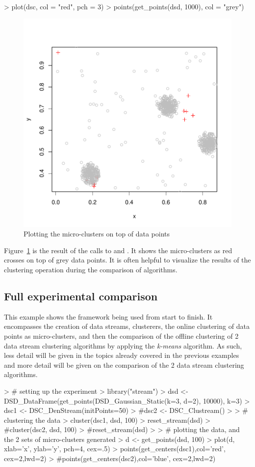 \documentclass[nojss]{jss}
\begin{document}
\begin{Schunk}
\begin{Sinput}
> plot(dsc, col = "red", pch = 3)
> points(get_points(dsd, 1000), col = "grey")
\end{Sinput}
\end{Schunk}

\begin{figure}
\centering
\includegraphics[width=.5\linewidth]{stream-plot2}
\caption{Plotting the micro-clusters on top of data points}
\label{figure:plot2}
\end{figure}

Figure~\ref{figure:plot2} is the result of the calls to  and . It shows the micro-clusters as red crosses on top of grey data points. It is often helpful to visualize the results of the clustering operation during the comparison of algorithms.

\subsection{Full experimental comparison}
\label{examples:full}

This example shows the  framework being used from start to finish. It encompasses the creation of data streams, clusterers, the online clustering of data points as micro-clusters, and then the comparison of the offline clustering of 2 data stream clustering algorithms by applying the \textit{k-means} algorithm. As such, less detail will be given in the topics already covered in the previous examples and more detail will be given on the comparison of the 2 data stream clustering algorithms.

\begin{Schunk}
\begin{Sinput}
> # setting up the experiment
> library("stream")
> dsd <- DSD_DataFrame(get_points(DSD_Gaussian_Static(k=3, d=2), 10000), k=3)
> dsc1 <- DSC_DenStream(initPoints=50)
> #dsc2 <- DSC_Clustream()
> 
> # clustering the data
> cluster(dsc1, dsd, 100)
> reset_stream(dsd)
> #cluster(dsc2, dsd, 100)
> #reset_stream(dsd)
> 
> # plotting the data, and the 2 sets of micro-clusters generated
> d <- get_points(dsd, 100)
> plot(d, xlab='x', ylab='y', pch=4, cex=.5)
> points(get_centers(dsc1),col='red', cex=2,lwd=2)
> #points(get_centers(dsc2),col='blue', cex=2,lwd=2)
\end{Sinput}
\end{Schunk}
\end{document}
